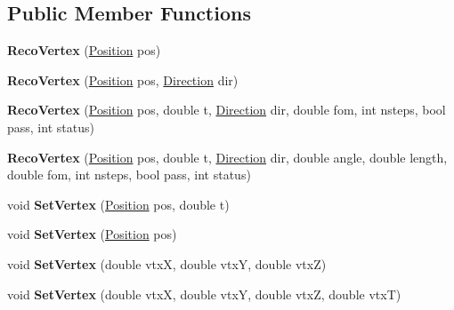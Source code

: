 \subsection*{Public Member Functions}
\begin{DoxyCompactItemize}
\item 
\hypertarget{classRecoVertex_a1b63b5a9f58bf69aa12da2b965398dbc}{
{\bfseries RecoVertex} (\hyperlink{classPosition}{Position} pos)}
\label{classRecoVertex_a1b63b5a9f58bf69aa12da2b965398dbc}

\item 
\hypertarget{classRecoVertex_aafab78d69771317ec57e0c1ac23b42e0}{
{\bfseries RecoVertex} (\hyperlink{classPosition}{Position} pos, \hyperlink{classDirection}{Direction} dir)}
\label{classRecoVertex_aafab78d69771317ec57e0c1ac23b42e0}

\item 
\hypertarget{classRecoVertex_aa085ca8edaac50177f2c82696ca1bb50}{
{\bfseries RecoVertex} (\hyperlink{classPosition}{Position} pos, double t, \hyperlink{classDirection}{Direction} dir, double fom, int nsteps, bool pass, int status)}
\label{classRecoVertex_aa085ca8edaac50177f2c82696ca1bb50}

\item 
\hypertarget{classRecoVertex_a3a85d3d51b10cd64c5540c518022a641}{
{\bfseries RecoVertex} (\hyperlink{classPosition}{Position} pos, double t, \hyperlink{classDirection}{Direction} dir, double angle, double length, double fom, int nsteps, bool pass, int status)}
\label{classRecoVertex_a3a85d3d51b10cd64c5540c518022a641}

\item 
\hypertarget{classRecoVertex_a9ab6116a0def24036d555e944e44d0c8}{
void {\bfseries SetVertex} (\hyperlink{classPosition}{Position} pos, double t)}
\label{classRecoVertex_a9ab6116a0def24036d555e944e44d0c8}

\item 
\hypertarget{classRecoVertex_af90c55e1af692ab5c96b27f27daddd2b}{
void {\bfseries SetVertex} (\hyperlink{classPosition}{Position} pos)}
\label{classRecoVertex_af90c55e1af692ab5c96b27f27daddd2b}

\item 
\hypertarget{classRecoVertex_afcff3ea42291b1b73dfb64aea3436ebe}{
void {\bfseries SetVertex} (double vtxX, double vtxY, double vtxZ)}
\label{classRecoVertex_afcff3ea42291b1b73dfb64aea3436ebe}

\item 
\hypertarget{classRecoVertex_a249a154ad1b80f739dde431c3b8e68d1}{
void {\bfseries SetVertex} (double vtxX, double vtxY, double vtxZ, double vtxT)}
\label{classRecoVertex_a249a154ad1b80f739dde431c3b8e68d1}


\end{DoxyCompactItemize}
